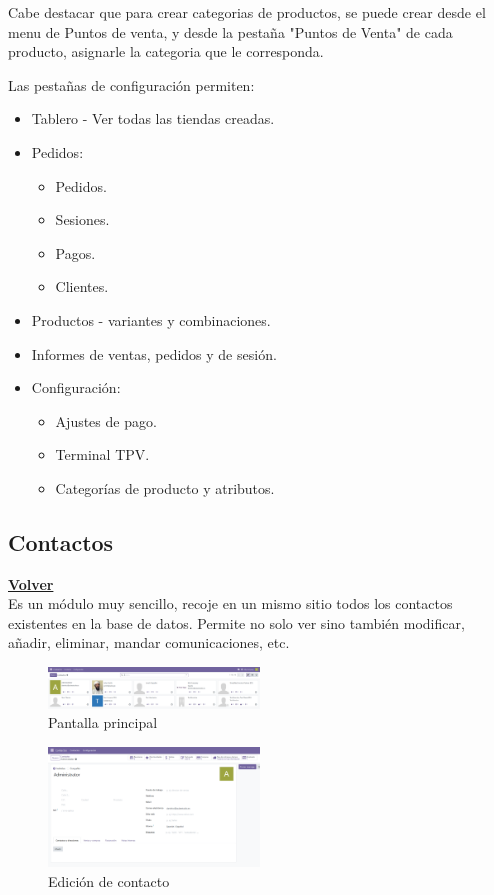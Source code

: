 \documentclass[a4paper,12pt]{article}
\begin{document}
Cabe destacar que para crear categorias de productos, se puede crear desde el menu de Puntos de venta, y desde la pestaña "Puntos de Venta" de cada producto, asignarle la categoria que le corresponda.

Las pestañas de configuración permiten:
\begin{itemize}
    \item Tablero - Ver todas las tiendas creadas.
    \item Pedidos:
    \begin{itemize}
        \item  Pedidos.
        \item  Sesiones.
        \item  Pagos.
        \item  Clientes.
    \end{itemize}
    \item Productos - variantes y combinaciones.
    \item Informes de ventas, pedidos y de sesión.
    \item Configuración:
    \begin{itemize}
        \item  Ajustes de pago.
        \item  Terminal TPV.
        \item  Categorías de producto y atributos.
    \end{itemize}
\end{itemize}


\subsection{Contactos}
\hyperlink{anchor-indice}{\textbf{Volver}}\\

Es un módulo muy sencillo, recoje en un mismo sitio todos los contactos existentes en la base de datos. Permite no solo ver sino también modificar, añadir, eliminar, mandar comunicaciones, etc.

\begin{figure}[h!]
    \centering
    \includegraphics[width=0.5\textwidth]{pr2odoo62-pantallaPrincipal.png}
    \caption{Pantalla principal}
\end{figure}
\FloatBarrier

\begin{figure}[h!]
    \centering
    \includegraphics[width=0.5\textwidth]{pr2odoo63-edicionContacto.png}
    \caption{Edición de contacto}
\end{figure}
\FloatBarrier
\end{document}
